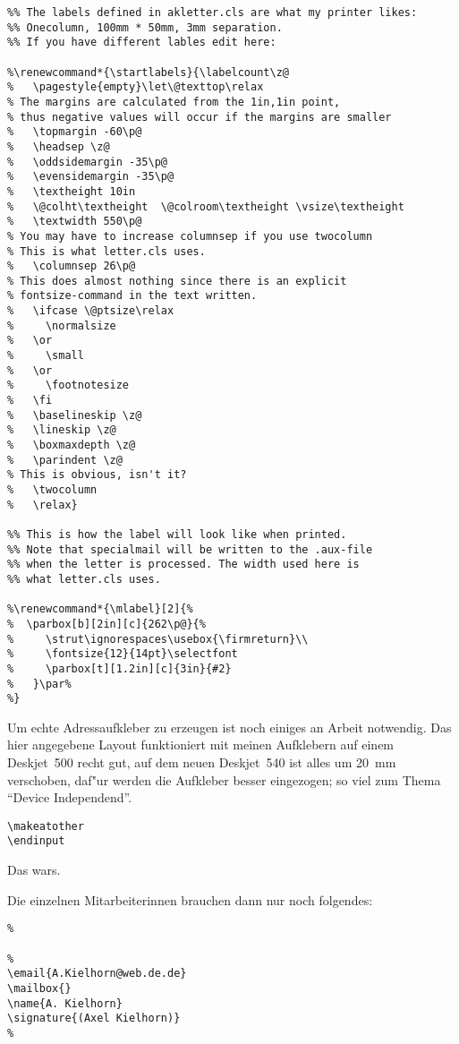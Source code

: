 \documentclass[a4paper]{article}
\begin{document}
\begin{verbatim}
%% The labels defined in akletter.cls are what my printer likes:
%% Onecolumn, 100mm * 50mm, 3mm separation.
%% If you have different lables edit here:

%\renewcommand*{\startlabels}{\labelcount\z@
%   \pagestyle{empty}\let\@texttop\relax
% The margins are calculated from the 1in,1in point,
% thus negative values will occur if the margins are smaller
%   \topmargin -60\p@
%   \headsep \z@
%   \oddsidemargin -35\p@
%   \evensidemargin -35\p@
%   \textheight 10in
%   \@colht\textheight	\@colroom\textheight \vsize\textheight
%   \textwidth 550\p@
% You may have to increase columnsep if you use twocolumn
% This is what letter.cls uses.
%   \columnsep 26\p@
% This does almost nothing since there is an explicit 
% fontsize-command in the text written.
%   \ifcase \@ptsize\relax
%     \normalsize
%   \or
%     \small
%   \or
%     \footnotesize
%   \fi
%   \baselineskip \z@
%   \lineskip \z@
%   \boxmaxdepth \z@
%   \parindent \z@
% This is obvious, isn't it?
%   \twocolumn
%   \relax}

%% This is how the label will look like when printed.
%% Note that specialmail will be written to the .aux-file
%% when the letter is processed. The width used here is
%% what letter.cls uses. 

%\renewcommand*{\mlabel}[2]{%
%  \parbox[b][2in][c]{262\p@}{%
%     \strut\ignorespaces\usebox{\firmreturn}\\
%     \fontsize{12}{14pt}\selectfont
%     \parbox[t][1.2in][c]{3in}{#2}
%   }\par%
%}
\end{verbatim}

Um echte Adressaufkleber zu erzeugen ist noch einiges an Arbeit 
notwendig. Das hier angegebene Layout funktioniert mit meinen 
Aufklebern auf einem Deskjet~500 recht gut, auf dem neuen 
Deskjet~540 ist alles um 20~mm verschoben, daf"ur werden die 
Aufkleber besser eingezogen; so viel zum Thema ``Device 
Independend''.

\begin{verbatim}
\makeatother
\endinput
\end{verbatim}

Das wars.

Die einzelnen Mitarbeiterinnen brauchen dann nur noch folgendes:

\begin{verbatim}
%

%
\email{A.Kielhorn@web.de.de}
\mailbox{}
\name{A. Kielhorn}
\signature{(Axel Kielhorn)}
%
\end{verbatim}
\end{document}
